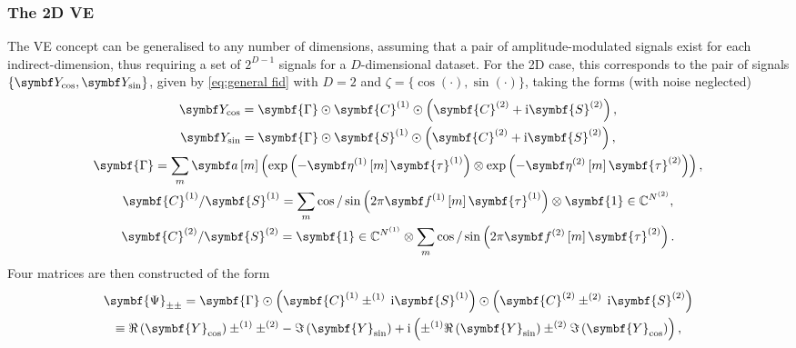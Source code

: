 \subsubsection{The \acs{2D} \acl{VE}}
The \ac{VE} concept can be generalised to any number of dimensions, assuming
that a pair of amplitude-modulated signals exist for each indirect-dimension,
thus requiring a set of $2^{D-1}$ signals for a $D$-dimensional dataset.
For the
\ac{2D} case, this corresponds to the pair of signals $\lbrace \bY_{\cos},
\bY_{\sin} \rbrace$, given by \eqref{eq:general fid} with $D=2$ and $\zeta = \lbrace
\cos(\cdot), \sin(\cdot) \rbrace$, taking the forms (with noise neglected)
\begin{subequations}
    \begin{gather}
        \bY_{\cos} =
            \symbf{\Gamma} \odot
            \symbf{C}^{(1)} \odot \left(
                \symbf{C}^{(2)} +
                \iu \symbf{S}^{(2)}
            \right), \\
        \bY_{\sin} =
            \symbf{\Gamma} \odot
            \symbf{S}^{(1)} \odot \left(
                \symbf{C}^{(2)} +
                \iu \symbf{S}^{(2)}
            \right), \\
        \symbf{\Gamma} =
            \sum_m \bdam \left(
                \exp \left( -\bdetaonem \symbf{\tau}^{(1)} \right) \otimes
                \exp \left( -\bdetatwom \symbf{\tau}^{(2)} \right)
            \right), \\
        \symbf{C}^{(1)} \text{/} \symbf{S}^{(1)}
        = \sum_{m} \cos \text{/} \sin \left(2 \pi \bdfonem \symbf{\tau}^{(1)} \right)
            \otimes \symbf{1} \in \mathbb{C}^{\Ntwo}, \\
        \symbf{C}^{(2)} \text{/} \symbf{S}^{(2)} =
            \symbf{1} \in \mathbb{C}^{\None} \otimes
            \sum_{m} \cos \text{/} \sin \left(2 \pi \bdftwom \symbf{\tau}^{(2)} \right).
    \end{gather}
\end{subequations}
Four matrices are then constructed of the form
\begin{equation}
    \begin{gathered}
        \symbf{\Psi}_{\pm\pm} =
            \symbf{\Gamma} \odot \left(
                \symbf{C}^{(1)} \pm^{(1)} \hspace*{2pt} \iu \symbf{S}^{(1)}
                \right) \odot \left(
                    \symbf{C}^{(2)} \pm^{(2)} \hspace*{2pt} \iu \symbf{S}^{(2)}
                \right) \\
         \equiv
             \Re\left( \symbf{Y}_{\cos} \right)
             \pm^{(1)} \pm^{(2)} -
             \Im\left( \symbf{Y}_{\sin} \right)
             + \iu \left(
             \pm^{(1)}
             \Re\left( \symbf{Y}_{\sin} \right)
             \pm^{(2)}
             \Im\left( \symbf{Y}_{\cos} \right)
             \right),
    \end{gathered}
\end{equation}
